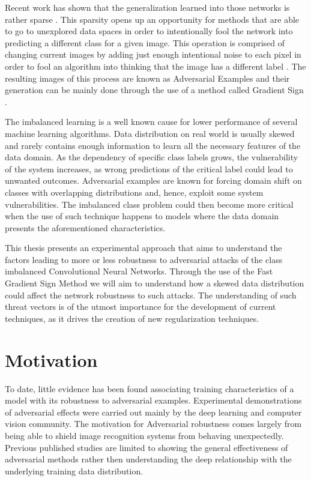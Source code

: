 Recent work has shown that the generalization learned into those networks is rather sparse \cite{goodfellow2016}. This sparsity opens up an opportunity for methods that are able to go to unexplored data spaces in order to intentionally fool the network into predicting a different class for a given image. This operation is comprised of changing current images by adding just enough intentional noise to each pixel in order to fool an algorithm into thinking that the image has a different label \cite{goodfellow2014}\cite{papernot2016transf}\cite{goodfellow2016}\cite{szegedy2013}. The resulting images of this process are known as Adversarial Examples and their generation can be mainly done through the use of a method called Gradient Sign \cite{goodfellow2014}.

The imbalanced learning is a well known cause for lower performance of several machine learning algorithms. Data distribution on real world is usually skewed and rarely contains enough information to learn all the necessary features of the data domain. As the dependency of specific class labels grows, the vulnerability of the system increases, as wrong predictions of the critical label could lead to unwanted outcomes. Adversarial examples are known for forcing domain shift on classes with overlapping distributions and, hence, exploit some system vulnerabilities. The imbalanced class problem could then become more critical when the use of such technique happens to models where the data domain presents the aforementioned characteristics.

This thesis presents an experimental approach that aims to understand the factors leading to more or less robustness to adversarial attacks of the class imbalanced Convolutional Neural Networks. Through the use of the Fast Gradient Sign Method we will aim to understand how a skewed data distribution could affect the network robustness to such attacks. The understanding of such threat vectors is of the utmost importance for the development of current techniques, as it drives the creation of new regularization techniques.


\section{Motivation}

To date, little evidence has been found associating training characteristics of a model with its robustness to adversarial examples. Experimental demonstrations of adversarial effects were carried out mainly by the deep learning and computer vision community. The motivation for Adversarial robustness comes largely from being able to shield image recognition systems from behaving unexpectedly. Previous published studies are limited to showing the general effectiveness of adversarial methods rather then understanding the deep relationship with the underlying training data distribution.

